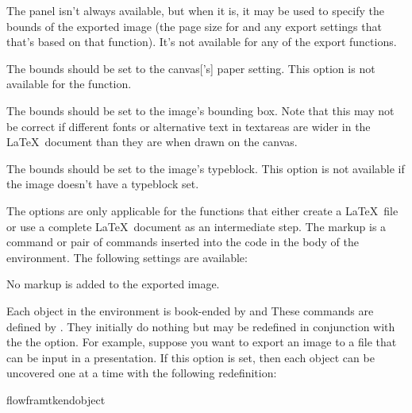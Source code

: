 The  panel isn't always available, but when it
is, it may be used to specify the bounds of the exported image (the
page size for  and any export settings that
that's based on that function).
It's not available for any of the 
export functions.


The bounds should be set to the \gls{canvas}['s] paper setting. This
option is not available for the  function.


The bounds should be set to the image's bounding box.
Note that this may not be correct if different fonts or alternative
text in \glspl{textarea} are wider in the \LaTeX\ document than they
are when drawn on the \gls{canvas}.


The bounds should be set to the image's \gls{typeblock}.
This option is not available if the image doesn't have a
\gls{typeblock} set.


The  options are only applicable for the
 functions that either create a
\LaTeX\ file or use a complete \LaTeX\ document as an intermediate
step. The markup is a command or pair of commands inserted into
the code in the body of the  environment.
The following settings are available:


No markup is added to the exported image.


Each object in the  environment is book-ended by
and
These commands are defined by . They initially
do nothing but may be redefined in conjunction with the
the  option.
For example, suppose you want to export an image to a file that can
be input in a  presentation. If this option is set, then each object can be
uncovered one at a time with the following redefinition:
\begin{codebox}
\gls{flowframtkendobject}
\end{codebox}

